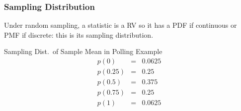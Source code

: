\begin{frame}
  \frametitle{Sampling Distribution}
  Under random sampling, a statistic is a RV so it has a PDF if continuous or PMF if discrete: this is its \alert{sampling distribution}. 

  \begin{block}{Sampling Dist.\ of Sample Mean in Polling Example}
   \begin{eqnarray*}
   p(0) &=&  0.0625\\
   p(0.25) &=&  0.25\\ 
   p(0.5) &=&  0.375\\
   p(0.75)&=& 0.25\\ 
   p(1) &=&  0.0625
   \end{eqnarray*}

  \end{block}
\end{frame}
